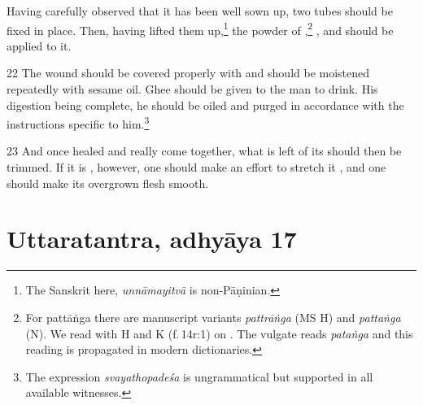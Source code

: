 \documentclass[12pt]{article}
\let\se\saneng  %
\begin{document}
\begin{translation}
        Having carefully observed that it has been well sown up,
        two tubes should be fixed in place.  Then, having lifted them up,\footnote{The 
        Sanskrit here, \emph{unnāmayitvā} is  non-Pāṇinian.}
        the powder of
        ,\footnote{For {pattāṅga} there are manuscript variants 
\emph{pattrāṅga} (MS H) and \emph{pattaṅga}    (N).  We read with H and K 
(f.\,14r:1) on \citet[1.14.36]{V}. The vulgate reads \emph{pataṅga} 
and this reading is propagated in modern dictionaries.}
        ,
        and
        should be applied to it.
        
       \item[22] 
     The wound should be covered properly with  and should be
     moistened repeatedly with sesame oil.  Ghee should be given to the man to
     drink.  His digestion being complete, he should be oiled and purged in
     accordance with the instructions specific to him.\footnote{The expression 
     \emph{svayathopadeśa} is ungrammatical but supported in all available 
     witnesses.}   
     
     \item[23] %
And once healed and really come together, what is left of its \se{vadhra}{flesh}
should then be trimmed. If it is  \se{hīna}{reduced}, however, one should make an
effort to stretch it , and one should make its overgrown flesh smooth.
     
     
    \end{translation}    



\section{Uttaratantra, adhyāya 17}
\end{document}
